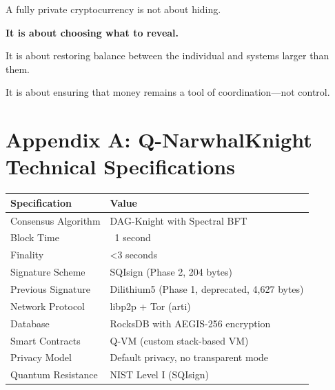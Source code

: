 \documentclass[12pt,a4paper]{article}
\begin{document}
A fully private cryptocurrency is not about hiding.

\textbf{It is about choosing what to reveal.}

It is about restoring balance between the individual and systems larger than them.

It is about ensuring that money remains a tool of coordination---not control.

\begin{center}
\end{center}

\vspace{1cm}

\section*{Appendix A: Q-NarwhalKnight Technical Specifications}

\begin{center}
\begin{tabular}{|l|l|}
\hline
\textbf{Specification} & \textbf{Value} \\
\hline
Consensus Algorithm & DAG-Knight with Spectral BFT \\
Block Time & ~1 second \\
Finality & <3 seconds \\
Signature Scheme & SQIsign (Phase 2, 204 bytes) \\
Previous Signature & Dilithium5 (Phase 1, deprecated, 4,627 bytes) \\
Network Protocol & libp2p + Tor (arti) \\
Database & RocksDB with AEGIS-256 encryption \\
Smart Contracts & Q-VM (custom stack-based VM) \\
Privacy Model & Default privacy, no transparent mode \\
Quantum Resistance & NIST Level I (SQIsign) \\
\hline
\end{tabular}
\end{center}

\end{document}
